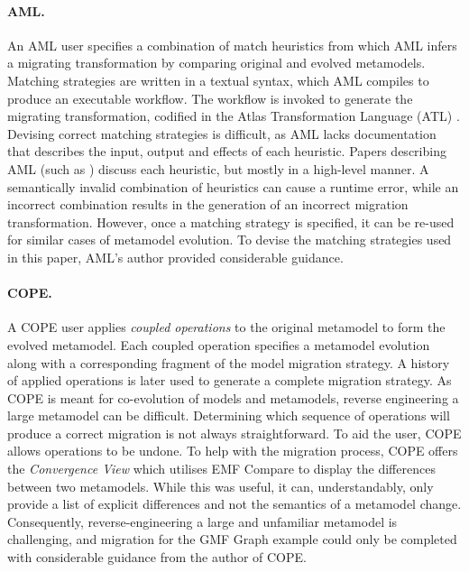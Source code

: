 \paragraph{AML.} An AML user specifies a combination of match heuristics from which AML infers a migrating transformation by comparing original and evolved metamodels. Matching strategies are written in a textual syntax, which AML compiles to produce an executable workflow. The workflow is invoked to generate the migrating transformation, codified in the Atlas Transformation Language (ATL) \cite{jouault05transforming}.
%
Devising correct matching strategies is difficult, as AML lacks documentation that describes the input, output and effects of each heuristic. Papers describing AML (such as \cite{garces09managing}) discuss each heuristic, but mostly in a high-level manner. A semantically invalid combination of heuristics can cause a runtime error, while an incorrect combination results in the generation of an incorrect migration transformation. However, once a matching strategy is specified, it can be re-used for similar cases of metamodel evolution. To devise the matching strategies used in this paper, AML's author provided considerable guidance.

\paragraph{COPE.} A COPE user applies \emph{coupled operations} to the original metamodel to form the evolved metamodel. Each coupled operation specifies a metamodel evolution along with a corresponding fragment of the model migration strategy. A history of applied operations is later used to generate a complete migration strategy.
%
As COPE is meant for co-evolution of models and metamodels, reverse engineering a large metamodel can be difficult. Determining which sequence of operations will produce a correct migration is not always straightforward. To aid the user, COPE allows operations to be undone.
%
To help with the migration process, COPE offers the \emph{Convergence View} which utilises EMF Compare to display the differences between two metamodels. While this was useful, it can, understandably, only provide a list of explicit differences and not the semantics of a metamodel change. Consequently, reverse-engineering a large and unfamiliar metamodel is challenging, and migration for the GMF Graph example could only be completed with considerable guidance from the author of COPE. %


